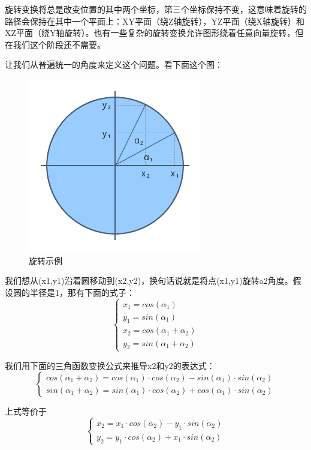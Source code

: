 \documentclass[UTF8,a4paper,12pt]{ctexbook}
\begin{document}
		旋转变换将总是改变位置的其中两个坐标，第三个坐标保持不变，这意味着旋转的路径会保持在其中一个平面上：XY平面（绕Z轴旋转），YZ平面（绕X轴旋转）和XZ平面（绕Y轴旋转）。也有一些复杂的旋转变换允许图形绕着任意向量旋转，但在我们这个阶段还不需要。
		
		让我们从普遍统一的角度来定义这个问题。看下面这个图：
			\begin{figure}[h]
				\centering
				\includegraphics[scale = 0.7]{rotate.png}
				\caption{旋转示例}
			\end{figure}
		
		我们想从(x1,y1)沿着圆移动到(x2,y2)，换句话说就是将点(x1,y1)旋转a2角度。假设圆的半径是1，那有下面的式子：
		\begin{equation}
			\begin{cases}
				x_1 = cos(\alpha_1)\\
				y_1 = sin(\alpha_1)\\
				x_2 = cos(\alpha_1 + \alpha_2)\\
				y_2 = sin(\alpha_1 + \alpha_2)
			\end{cases}
		\end{equation}
		
		我们用下面的三角函数变换公式来推导x2和y2的表达式：
		$$
			\begin{cases}
				cos(\alpha_1 + \alpha_2) = cos(\alpha_1)\cdot cos(\alpha_2) - sin(\alpha_1)\cdot sin(\alpha_2)\\
				sin(\alpha_1 + \alpha_2) = sin(\alpha_1)\cdot cos(\alpha_2) + cos(\alpha_1)\cdot sin(\alpha_2)
			\end{cases}
		$$
		
		上式等价于
		$$
		\begin{cases}
			x_2 = x_1\cdot cos(\alpha_2) - y_1\cdot sin(\alpha_2)\\
			y_2 = y_1\cdot cos(\alpha_2) + x_1\cdot sin(\alpha_2)
		\end{cases}
		$$
		
\end{document}
